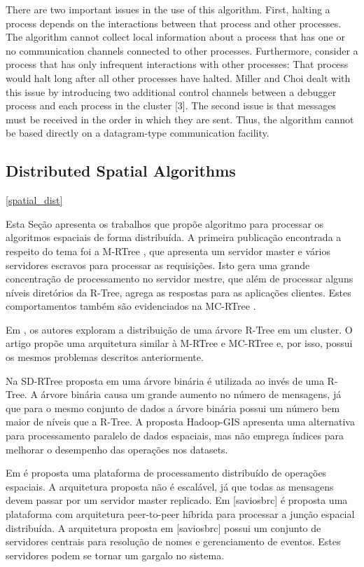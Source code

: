 	There are two important issues in the use of this algorithm. First, halting a process depends on the interactions between that process and other processes. The algorithm cannot collect local information about a process that has one or no communication channels connected to other processes. Furthermore, consider a process that has only infrequent interactions with other processes: That process would halt long after all other processes have halted. Miller and Choi dealt with this issue by introducing two additional control channels between a debugger process and each process in the cluster [3]. The second issue is that messages must be received in the order in which they are sent. Thus, the algorithm cannot be based directly on a datagram-type communication facility.	
	
\subsection{Distributed Spatial Algorithms}
\ref{spatial_dist}

Esta Seção apresenta os trabalhos que propõe algoritmo para processar os algoritmos espaciais de forma distribuída.
A primeira publicação encontrada a respeito do tema foi a M-RTree \cite{koudas1996declustering}, que apresenta um servidor master e vários servidores escravos para processar as requisições. Isto gera uma grande concentração
de processamento no servidor mestre, que além de processar alguns níveis diretórios da R-Tree, agrega as respostas para
as aplicações clientes. Estes comportamentos também são evidenciados na MC-RTree \cite{schnitzer1999master}.

Em \cite{an1999storing}, os autores exploram a distribuição de uma árvore R-Tree em
um cluster. O artigo propõe uma arquitetura similar à M-RTree e MC-RTree e, por isso,
possui os mesmos problemas descritos anteriormente.

Na SD-RTree proposta em \cite{du2007sd} uma árvore binária é utilizada ao invés de uma R-Tree.
A árvore binária causa um grande aumento no número de mensagens, já que para o mesmo conjunto de dados a árvore binária possui um número bem maior de níveis que a R-Tree. A proposta Hadoop-GIS \cite{Kerr 2009} apresenta uma alternativa para processamento paralelo de dados espaciais, mas não emprega índices para melhorar o desempenho das operações nos datasets.

Em \cite{dedsi} é proposta uma plataforma de processamento distribuído de operações espaciais. A arquitetura proposta não é escalável, já que todas as mensagens devem passar por um servidor master replicado. Em [saviosbrc] é proposta uma plataforma com arquitetura peer-to-peer híbrida para processar a junção espacial distribuída. A arquitetura proposta em [saviosbrc] possui um conjunto de servidores centrais para resolução de nomes e gerenciamento de eventos. Estes servidores podem se tornar um gargalo no sistema.

